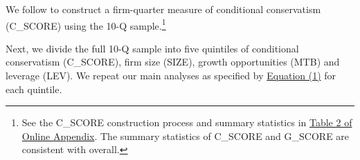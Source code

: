 \documentclass[letterpaper,12pt]{article}
\begin{document}
\begin{spacing}{1.5}
We follow  to construct a firm-quarter measure of conditional conservatism (C\_SCORE) using the 10-Q sample.\footnote{See the C\_SCORE construction process and summary statistics in \hyperref[oat2]{Table 2 of Online Appendix}. The summary statistics of C\_SCORE and G\_SCORE are consistent with  overall. }
\begin{comment}
Specifically, we run the following cross-sectional model for each fiscal year from 1993 to 2015:
\begin{equation} \label{eq3}
\begin{split}
EARN_{i,t} = \beta_0&+\beta_1NEG_{i,t}+\beta_2RET_{i,t}\\
&+\beta_3RET_{i,t}\times SIZE_{i,t}+\beta_4RET_{i,t}\times MTB_{i,t}+\beta_5RET_{i,t}\times LEV_{i,t}+\beta_6RET_{i,t}\times NEG_{i,t}\\
&+\beta_7RET_{i,t}\times NEG_{i,t}\times SIZE_{i,t}+\beta_8RET_{i,t}\times NEG_{i,t}\times MTB_{i,t}+\beta_9RET_{i,t}\times NEG_{i,t}\times LEV_{i,t}\\
&+\beta_{10}SIZE_{i,t}+\beta_{11}MTB_{i,t}+\beta_{12}LEV_{i,t}\\
&+\beta_{13}NEG_{i,t}\times SIZE_{i,t}+\beta_{14}NEG_{i,t}\times MTB_{i,t}+\beta_{15}NEG_{i,t}\times LEV_{i,t}+ \epsilon_{i,t}
\end{split}
\end{equation}
We obtain the estimates from Equation (3) and use them to calculate C\_SCORE and G\_SCORE following Equation (4) and Equation (5) respectively. C\_SCORE captures the incremental timeliness of bad news and measures conditional conservatism, with more positive value being more conditionally conservative. G\_SCORE captures the timeliness of good news.
\begin{equation}\label{eq4}
C\_SCORE_{i,t} = \beta_6+\beta_7SIZE_{i,t}+\beta_8MTB_{i,t}+\beta_9LEV_{i,t}
\end{equation}
\begin{equation}\label{eq5}
G\_SCORE_{i,t} = \beta_2+\beta_3SIZE_{i,t}+\beta_4MTB_{i,t}+\beta_5LEV_{i,t}
\end{equation}

The mean and standard errors of coefficients obtained from \hyperref[eq3]{Equation (3)} and the summary statistics of C\_SCORE and G\_SCORE (see \hyperref[oat2]{Table 2 of Online Appendix}) are consistent with \citeA{khanEstimationEmpiricalProperties2009} overall. 
\end{comment}
Next, we divide the full 10-Q sample into five quintiles of conditional conservatism (C\_SCORE), firm size (SIZE), growth opportunities (MTB) and leverage (LEV). We repeat our main analyses as specified by \hyperref[eq1]{Equation (1)} for each quintile.


\end{spacing}
\end{document}
